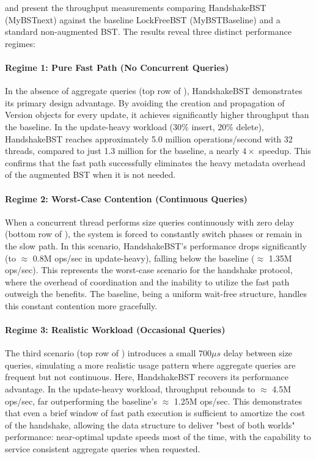 \documentclass[acmsmall,screen,nonacm]{acmart}
\newcommand{\codestyle}[1]{{{\fontsize{9}{10}\ttfamily #1}}}
\newcommand{\size}{\codestyle{size}}
\begin{document}
 and  present the throughput measurements comparing HandshakeBST (\codestyle{MyBSTnext}) against the baseline LockFreeBST (\codestyle{MyBSTBaseline}) and a standard non-augmented BST. The results reveal three distinct performance regimes:

\paragraph{Regime 1: Pure Fast Path (No Concurrent Queries)}
In the absence of aggregate queries (top row of ), HandshakeBST demonstrates its primary design advantage. By avoiding the creation and propagation of \codestyle{Version} objects for every update, it achieves significantly higher throughput than the baseline. In the update-heavy workload (30\% insert, 20\% delete), HandshakeBST reaches approximately 5.0 million operations/second with 32 threads, compared to just 1.3 million for the baseline, a nearly $4\times$ speedup. This confirms that the fast path successfully eliminates the heavy metadata overhead of the augmented BST when it is not needed.

\paragraph{Regime 2: Worst-Case Contention (Continuous Queries)}
When a concurrent thread performs \size{} queries continuously with zero delay (bottom row of ), the system is forced to constantly switch phases or remain in the slow path. In this scenario, HandshakeBST's performance drops significantly (to $\approx$ 0.8M ops/sec in update-heavy), falling below the baseline ($\approx$ 1.35M ops/sec). This represents the worst-case scenario for the handshake protocol, where the overhead of coordination and the inability to utilize the fast path outweigh the benefits. The baseline, being a uniform wait-free structure, handles this constant contention more gracefully.

\paragraph{Regime 3: Realistic Workload (Occasional Queries)}
The third scenario (top row of ) introduces a small $700\mu s$ delay between size queries, simulating a more realistic usage pattern where aggregate queries are frequent but not continuous. Here, HandshakeBST recovers its performance advantage. In the update-heavy workload, throughput rebounds to $\approx$ 4.5M ops/sec, far outperforming the baseline's $\approx$ 1.25M ops/sec. This demonstrates that even a brief window of fast path execution is sufficient to amortize the cost of the handshake, allowing the data structure to deliver "best of both worlds" performance: near-optimal update speeds most of the time, with the capability to service consistent aggregate queries when requested.
\end{document}
